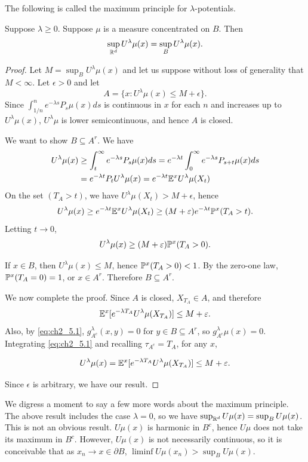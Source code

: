 The following is called the maximum principle for $\lambda$-potentials.

\begin{theorem}\label{thm:ch2_5.2}
Suppose $\lambda \geq 0$. Suppose $\mu$ is a measure concentrated on $B$.
Then
\[\sup_{\R^d} U^\lambda\mu(x) = \sup_{B} U^\lambda\mu(x).\]
\end{theorem}

\begin{proof}
Let $M = \sup_B U^\lambda\mu(x)$ and let us suppose without loss of generality
that $M < \infty$. Let $\epsilon > 0$ and let
\[
    A = \{x : U^\lambda\mu(x) \leq M + \epsilon\}.
\]
Since $\int_{1/n}^n e^{-\lambda s}P_s\mu(x)ds$ is continuous in $x$ for each $n$ and increases up to $U^\lambda\mu(x)$, $U^\lambda\mu$ is lower semicontinuous, and hence $A$ is closed.

We want to show $B \subseteq A^r$. We have
\begin{align*}
    U^\lambda\mu(x) &\geq \int_t^\infty e^{-\lambda s}P_s\mu(x)ds = e^{-\lambda t}\int_0^\infty e^{-\lambda s}P_{s+t}\mu(x)ds \\
    &= e^{-\lambda t}P_tU^\lambda\mu(x) = e^{-\lambda t}\E^xU^\lambda\mu(X_t)
\end{align*}
On the set $(T_A > t)$, we have $U^\lambda\mu(X_t) > M + \epsilon$, hence
\[
    U^\lambda\mu(x) \geq e^{-\lambda t}\E^xU^\lambda\mu(X_t) \geq (M + \epsilon)e^{-\lambda t}\P^x(T_A > t).
\]
Letting $t \to 0$,
\[
    U^\lambda\mu(x) \geq (M + \epsilon)\P^x(T_A > 0).
\]

If $x \in B$, then $U^\lambda\mu(x) \leq M$, hence $\P^x(T_A > 0) < 1$. By the zero-one law, $\P^x(T_A = 0) = 1$, or $x \in A^r$. Therefore $B \subseteq A^r$.

We now complete the proof. Since $A$ is closed, $X_{T_A} \in A$, and therefore
\[
    \E^x[e^{-\lambda T_A}U^\lambda\mu(X_{T_A})] \leq M + \epsilon.
\]
Also, by \eqref{eq:ch2_5.1}, $g_{A^c}^\lambda(x,y) = 0$ for $y \in B \subseteq A^r$, so $g_{A^c}^\lambda\mu(x) = 0$. Integrating \eqref{eq:ch2_5.1} and recalling $\tau_{A^c} = T_A$, for any $x$,

\[U^\lambda\mu(x) = \E^x[e^{-\lambda T_A}U^\lambda\mu(X_{T_A})] \leq M + \epsilon.\]

Since $\epsilon$ is arbitrary, we have our result.
\end{proof}

We digress a moment to say a few more words about the maximum principle. The above result includes the case $\lambda = 0$, so we have $\sup_{\R^d} U\mu(x) = \sup_B U\mu(x)$. This is not an obvious result. $U\mu(x)$ is harmonic in $B^c$, hence $U\mu$ does not take its maximum in $B^c$. However, $U\mu(x)$ is not necessarily continuous, so it is conceivable that as $x_n \to x \in \partial B$, $\liminf U\mu(x_n) > \sup_B U\mu(x)$.

